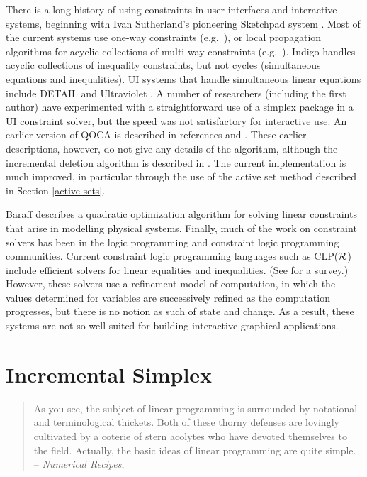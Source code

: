 \documentclass{article}
\begin{document}
There is a long history of using constraints in user interfaces and
interactive systems, beginning with Ivan Sutherland's pioneering Sketchpad
system \cite{sutherland-ifips-63}.  Most of the current systems use one-way
constraints (e.g.\ \cite{hudson-subarctic-manual,myers-chi-96}), or local
propagation algorithms for acyclic collections of multi-way constraints
(e.g.\ \cite{sannella-spe-93,vander-zanden-toplas-96}).
Indigo \cite{borning-uist-96} handles acyclic collections of inequality
constraints, but not cycles (simultaneous equations and inequalities).  UI
systems that handle simultaneous linear equations include \mbox{DETAIL}
\cite{hosobe-cp-96} and Ultraviolet \cite{borning-cp-95}.  A number of
researchers (including the first author) have experimented with a
straightforward use of a simplex package in a UI constraint solver,
but the speed was not satisfactory for interactive use.
An earlier version of QOCA is described in references \cite{helm-gi-92} and
\cite{helm-eurographics-92}.  These earlier descriptions, however, do not
give any details of the algorithm, although the incremental deletion
algorithm is described in \cite{huynh-marriott-96}.  
The current implementation is
much improved, in particular through the use of the active set method
described in Section \ref{active-sets}.

Baraff \cite{baraff-siggraph-94} describes a quadratic optimization
algorithm for solving linear constraints that arise in modelling physical
systems.  Finally, much of the work on constraint solvers
has been in the logic programming and constraint logic programming
communities.  Current constraint logic programming languages such as
CLP($\cal R$) \cite{jaffar-toplas-92} include efficient solvers for linear
equalities and inequalities.  (See \cite{marriott-stuckey-book} for a
survey.)  However, these solvers use a refinement model of computation, in
which the values determined for variables are successively refined as the
computation progresses, but there is no notion as such of state and change.
As a result, these systems are not so well suited for building interactive
graphical applications.

\section{Incremental Simplex}
\label{inc-simplex}

\begin{quotation}
As you see, the subject of linear programming is surrounded by notational
and terminological thickets.  Both of these thorny defenses are lovingly
cultivated by a coterie of stern acolytes who have devoted themselves to
the field.  
Actually, the basic ideas of linear programming are quite simple. 
-- {\em Numerical Recipes}, \cite[page 424]{press-89}
\end{quotation}
\end{document}
